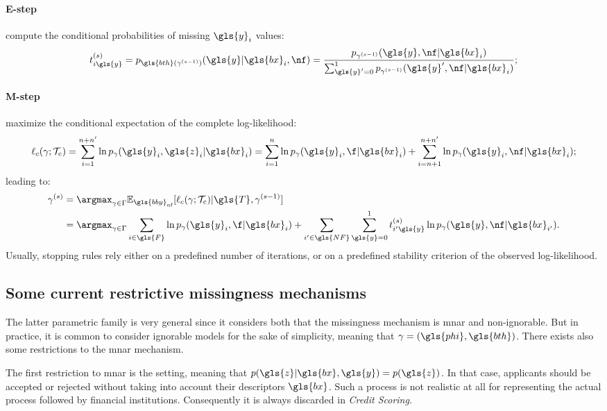 \paragraph{E-step} compute the conditional probabilities of missing $\gls{y}_i$ values:
\begin{equation}
t_{i\gls{y}}^{(s)} = p_{\gls{bth}(\gamma^{(s-1)})}(\gls{y}|\gls{bx}_i,\nf) = \frac{p_{\gamma^{(s-1)}}(\gls{y}, \nf|\gls{bx}_i)}{\sum_{\gls{y}' = 0}^{1} p_{\gamma^{(s-1)}}(\gls{y}', \nf|\gls{bx}_i)};
\end{equation}
\paragraph{M-step} maximize the conditional expectation of the complete log-likelihood:
\begin{equation}\label{eq:like.c}
\ell_c(\gamma;\mathcal{T}_{\text{c}}) = \sum_{i=1}^{n+n'}\ln p_{\gamma}(\gls{y}_i,\gls{z}_i | \gls{bx}_i) = \sum_{i=1}^{n}\ln p_{\gamma}(\gls{y}_i,\f | \gls{bx}_i) + \sum_{i=n+1}^{n+n'}\ln p_{\gamma}(\gls{y}_i,\nf | \gls{bx}_i);
\end{equation}
leading to:
\begin{align*}
\gamma^{(s)} & = \argmax_{\gamma \in \Gamma} \mathbb{E}_{\gls{bby}_{\text{nf}}} [\ell_c(\gamma;\mathcal{T}_{\text{c}}) | \gls{T},\gamma^{(s-1)}] \\
& = \argmax_{\gamma \in \Gamma} \sum_{i\in \gls{F}} \ln p_{\gamma}(\gls{y}_i, \f|\gls{bx}_i) +  \sum_{i'\in \gls{NF}}\sum_{\gls{y} = 0}^{1}t_{i'\gls{y}}^{(s)} \ln p_{\gamma}(\gls{y}, \nf | \gls{bx}_{i'}).
\end{align*}
Usually, stopping rules rely either on a predefined number of iterations, or on a predefined stability criterion of the observed log-likelihood.

\subsection{Some current restrictive missingness mechanisms}
\label{sec:mechanisms}

The latter parametric family is very general since it considers both that the missingness mechanism is \gls{mnar} and non-ignorable. But in practice, it is common to consider ignorable models for the sake of simplicity, meaning that $\gamma= (\gls{phi},\gls{bth})$. There exists also some restrictions to the \gls{mnar} mechanism. 

The first restriction to \gls{mnar} is the  setting, meaning that $p(\gls{z}| \gls{bx},\gls{y}) = p(\gls{z})$. In that case, applicants should be accepted or rejected without taking into account their descriptors $\gls{bx}$. Such a process is not realistic at all for representing the actual process followed by financial institutions. Consequently it is always discarded in \textit{Credit Scoring}.

